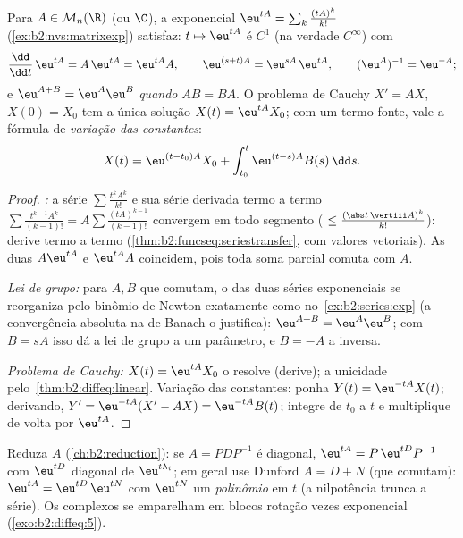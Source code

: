 \begin{theorem}\label{thm:b2:diffeq:matrixexp}
Para $A \in \mathcal{M}_n(\R)$ (ou $\C$), a exponencial $\eu^{tA}
= \sum_k \frac{(tA)^k}{k!}$ (\cref{ex:b2:nvs:matrixexp}) satisfaz:
$t \mapsto \eu^{tA}$ é $C^1$ (na verdade $C^\infty$)
com
\[
\frac{\dd}{\dd t}\,\eu^{tA} = A\,\eu^{tA} = \eu^{tA}A ,
\qquad
\eu^{(s+t)A} = \eu^{sA}\,\eu^{tA},
\qquad
(\eu^{A})^{-1} = \eu^{-A} ;
\]
e $\eu^{A + B} = \eu^A\eu^B$ \emph{quando} $AB = BA$. O problema
de Cauchy $X' = AX$, $X(0) = X_0$ tem a única solução $X(t) =
\eu^{tA}X_0$; com um termo fonte, vale a fórmula de \emph{variação
das constantes}:
\[
X(t) = \eu^{(t - t_0)A}X_0 + \int_{t_0}^{t} \eu^{(t-s)A}B(s)\,\dd
s .
\]
\end{theorem}

\begin{proof}
\emph{:} a série $\sum \frac{t^kA^k}{k!}$ e
sua série derivada termo a termo $\sum \frac{t^{k-1}A^k}{(k-1)!} = A\sum
\frac{(tA)^{k-1}}{(k-1)!}$ convergem  em todo segmento
( $\leq \frac{(\abs t\,\vertiii A)^k}{k!}$): derive
termo a termo (\cref{thm:b2:funcseq:seriestransfer}, com valores vetoriais).
As duas  $A\eu^{tA}$ e $\eu^{tA}A$ coincidem, pois toda
soma parcial comuta com $A$.

\emph{Lei de grupo:} para $A, B$ que comutam, o  das
duas séries exponenciais se reorganiza pelo binômio de Newton exatamente
como no~\cref{ex:b2:series:exp} (a convergência absoluta na  de
Banach o justifica): $\eu^{A+B} = \eu^A\eu^B$; com $B = sA$ isso
dá a lei de grupo a um parâmetro, e $B = -A$ a inversa.

\emph{Problema de Cauchy:} $X(t) = \eu^{tA}X_0$ o resolve (derive);
a unicidade pelo~\cref{thm:b2:diffeq:linear}. Variação das constantes:
ponha $Y(t) = \eu^{-tA}X(t)$; derivando, $Y' = \eu^{-tA}(X' -
AX) = \eu^{-tA}B(t)$; integre de $t_0$ a $t$ e multiplique
de volta por $\eu^{tA}$.
\end{proof}

\begin{method}[Calcular $\eu^{tA}$]\label{met:b2:diffeq:computeexp}
Reduza $A$ (\cref{ch:b2:reduction}): se $A = PDP^{-1}$ é diagonal,
$\eu^{tA} = P\,\eu^{tD}P^{-1}$ com $\eu^{tD}$ diagonal de
$\eu^{t\lambda_i}$; em geral use Dunford $A = D + N$
(que comutam): $\eu^{tA} = \eu^{tD}\,\eu^{tN}$ com $\eu^{tN}$ um
\emph{polinômio} em $t$ (a nilpotência trunca a série). Os
 complexos se emparelham em blocos rotação vezes exponencial
(\cref{exo:b2:diffeq:5}).
\end{method}


